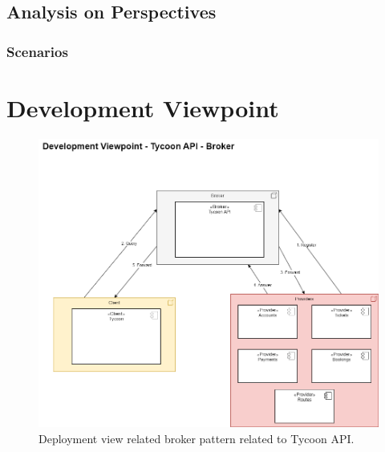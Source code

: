 \subsection{Analysis on Perspectives}
\begin{table}[h!]
    \centering
    \caption{Deployment View Prioritized Quality Attributes}
    \label{tab:deployment_view}
\end{table}

\subsubsection{Scenarios}


\section{Development Viewpoint}

\begin{figure}[H]
    \centering
    \includegraphics[width=\textwidth]{drawings/views_final_version/development_view_broker.png}
    \caption{Deployment view related broker pattern related to Tycoon API.}
    \label{fig:development_view_broker}
\end{figure}

